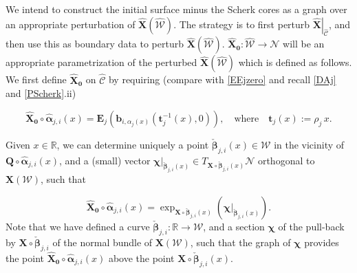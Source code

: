 \documentclass[12pt,namelimits,sumlimits]{amsart}
\theoremstyle{remark}
\numberwithin{equation}{section}
\begin{document}
We intend to construct the initial surface minus the Scherk cores as a graph over an
appropriate perturbation of ${\widehat{\boldsymbol{X}}}({{\widehat{{\mathcal{W}}}}})$.
The strategy is to first perturb 
$\left.{\widehat{\boldsymbol{X}}}\right|_{{\widehat{{\mathcal{C}}}}}$,
and then use this as boundary data to perturb ${\widehat{\boldsymbol{X}}}({{\widehat{{\mathcal{W}}}}})$.
${\widehat{\boldsymbol{X}}}_{{\boldsymbol{0}}}:{{\widehat{{\mathcal{W}}}}}\to{{\mathcal{N}}}$ will be an appropriate parametrization of the perturbed ${\widehat{\boldsymbol{X}}}({{\widehat{{\mathcal{W}}}}})$ which is defined as
follows.
We first define ${\widehat{\boldsymbol{X}}}_{{\boldsymbol{0}}}$ on ${{\widehat{{\mathcal{C}}}}}$ by requiring (compare with \ref{EEjzero} and recall \ref{DAj} and \ref{PScherk}.ii)
\addtocounter{theorem}{1}
\begin{equation}
\label{EXhat0C}
{\widehat{\boldsymbol{X}}}_{{\boldsymbol{0}}}\circ{\widehat{\boldsymbol{\alpha}}}_{j,i}(x)
=
{\boldsymbol{E}}_j
\left({\boldsymbol{b}}_{i,\alpha_j(x)}({\boldsymbol{t}}_j^{-1}(x),0)\right),
\quad\text{where}\quad
{\boldsymbol{t}}_j(x):=\rho_j\, x.
\end{equation}

Given $x\in{\mathbb{R}}$,
we can determine uniquely a point ${\check{\boldsymbol{\beta}}}_{j,i}(x)\in{{\mathcal{W}}}$ in the vicinity of 
${\boldsymbol{Q}}\circ{\widehat{\boldsymbol{\alpha}}}_{j,i}(x)$,
and a (small) vector $\left.{\boldsymbol{\chi}}\right|_{{\check{\boldsymbol{\beta}}}_{j,i}(x)}\in T_{{\boldsymbol{X}}\circ{\check{\boldsymbol{\beta}}}_{j,i}(x) }{{\mathcal{N}}}$
orthogonal to ${\boldsymbol{X}}({{\mathcal{W}}})$,
such that
\addtocounter{theorem}{1}
\begin{equation}
\label{Ebehat}
{\widehat{\boldsymbol{X}}}_{{\boldsymbol{0}}}\circ{\widehat{\boldsymbol{\alpha}}}_{j,i}(x)
=
\exp_{{\boldsymbol{X}}\circ{\check{\boldsymbol{\beta}}}_{j,i}(x)}(\left.{\boldsymbol{\chi}}\right|_{{\check{\boldsymbol{\beta}}}_{j,i}(x) }).
\end{equation}
Note that we have defined a curve ${\check{\boldsymbol{\beta}}}_{j,i}:{\mathbb{R}}\to{{\mathcal{W}}}$,
and a section ${\boldsymbol{\chi}}$ of the pull-back by ${\boldsymbol{X}}\circ{\check{\boldsymbol{\beta}}}_{j,i}$ of the normal bundle of ${\boldsymbol{X}}({{\mathcal{W}}})$,
such that the graph of ${\boldsymbol{\chi}}$ provides
the point ${\widehat{\boldsymbol{X}}}_{{\boldsymbol{0}}}\circ{\widehat{\boldsymbol{\alpha}}}_{j,i}(x)$
above the point ${\boldsymbol{X}}\circ{\check{\boldsymbol{\beta}}}_{j,i}(x)$.
\end{document}
